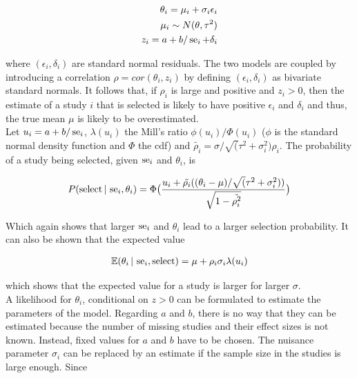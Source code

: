 \documentclass[11pt,a4paper,twoside]{book}\usepackage[]{graphicx}\usepackage[]{color}
\begin{document}
\begin{align}
\theta_i = \mu_i + \sigma_i\epsilon_i \nonumber \\ 
\mu_i \sim N(\theta, \tau^2) \nonumber \\
z_i = a + b/\operatorname{se}_i + \delta_i \nonumber
\end{align}

where $(\epsilon_i, \delta_i)$ are standard normal residuals. The two models are coupled by introducing a correlation $\rho = cor(\theta_i, z_i)$ by defining $(\epsilon_i, \delta_i)$ as bivariate standard normals. It follows that,
if $\rho_i$ is large and positive and $z_i > 0$, then the estimate of a study $i$ that is selected is likely to have positive $\epsilon_i$ and $\delta_i$ and thus, the true mean $\mu$ is likely to be overestimated. \\
Let $u_i = a + b/\operatorname{se}_i$, $\lambda(u_i)$ the Mill's ratio $\phi(u_i)/\Phi(u_i)$ ($\phi$ is the standard normal density function and $\Phi$ the cdf) and $\tilde{\rho_i} = \sigma/\sqrt(\tau^2 + \sigma_i^2) \rho_i$. The probability of a study being selected, given $\operatorname{se}_i$ and $\theta_i$, is

\begin{align}
P(\textrm{select} \given \se_i, \theta_i) = %
\Phi\big(\frac{u_i + \tilde{\rho_i}((\theta_i - \mu)/\sqrt(\tau^2 + \sigma_i^2))}{\sqrt{1 - \tilde{\rho_i^2}}}\big) \nonumber
\end{align}

Which again shows that larger $\operatorname{se}_i$ and $\theta_i$ lead to a larger selection probability. It can also be shown that the expected value 

\begin{align}
\mathbb{E}(\theta_i \,\vert\, \operatorname{se}_i, \textrm{select}) = \mu + \rho_i\sigma_i\lambda(u_i) \label{eq:copas.expectation}
\end{align}

which shows that the expected value for a study is larger for larger $\sigma$. \\
A likelihood for $\theta_i$, conditional on $z>0$ can be formulated to estimate the parameters of the model. Regarding $a$ and $b$, there is no way that they can be estimated because the number of missing studies and their effect sizes is not known. Instead, fixed values for $a$ and $b$ have to be chosen.
The nuisance parameter $\sigma_i$ can be replaced by an estimate if the sample size in the studies is large enough. Since
\end{document}
